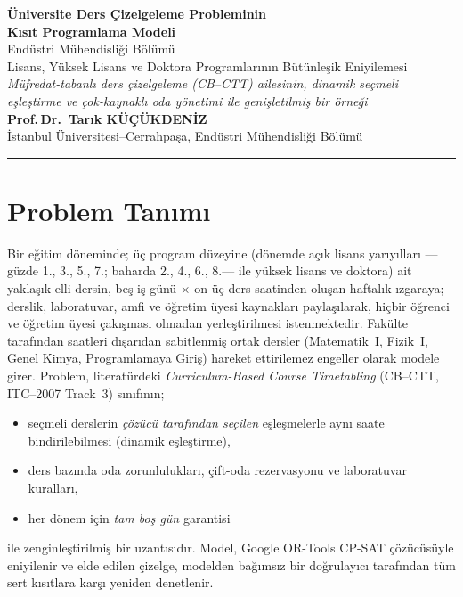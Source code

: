 \documentclass[11pt,a4paper]{article}
\theoremstyle{definition}
\begin{document}
\begin{center}
  {\color{iucnavy}\LARGE\bfseries Üniversite Ders Çizelgeleme Probleminin\\[2pt]
  Kısıt Programlama Modeli}\\[8pt]
  {\large Endüstri Mühendisliği Bölümü\\
  Lisans, Yüksek Lisans ve Doktora Programlarının Bütünleşik Eniyilemesi}\\[6pt]
  {\small\itshape Müfredat-tabanlı ders çizelgeleme (CB--CTT) ailesinin,
  dinamik seçmeli eşleştirme ve çok-kaynaklı oda yönetimi ile genişletilmiş bir örneği}\\[10pt]
  {\normalsize\bfseries Prof.\,Dr.\ Tarık KÜÇÜKDENİZ}\\[2pt]
  {\small İstanbul Üniversitesi--Cerrahpaşa, Endüstri Mühendisliği Bölümü}\\[6pt]
  \rule{0.6\textwidth}{0.6pt}
\end{center}

\section{Problem Tanımı}

Bir eğitim döneminde; üç program düzeyine (dönemde açık lisans yarıyılları ---
güzde 1., 3., 5., 7.; baharda 2., 4., 6., 8.--- ile yüksek lisans ve doktora) ait yaklaşık elli dersin, beş iş günü $\times$ on üç ders
saatinden oluşan haftalık ızgaraya; derslik, laboratuvar, amfi ve öğretim üyesi
kaynakları paylaşılarak, hiçbir öğrenci ve öğretim üyesi çakışması olmadan
yerleştirilmesi istenmektedir. Fakülte tarafından saatleri dışarıdan sabitlenmiş
ortak dersler (Matematik~I, Fizik~I, Genel Kimya, Programlamaya Giriş) hareket
ettirilemez engeller olarak modele girer. Problem, literatürdeki
\emph{Curriculum-Based Course Timetabling} (CB--CTT, ITC--2007 Track~3) sınıfının;
\begin{itemize}[nosep]
  \item seçmeli derslerin \emph{çözücü tarafından seçilen} eşleşmelerle aynı saate
        bindirilebilmesi (dinamik eşleştirme),
  \item ders bazında oda zorunlulukları, çift-oda rezervasyonu ve laboratuvar
        kuralları,
  \item her dönem için \emph{tam boş gün} garantisi
\end{itemize}
ile zenginleştirilmiş bir uzantısıdır. Model, Google OR-Tools \textsc{CP-SAT}
çözücüsüyle eniyilenir ve elde edilen çizelge, modelden bağımsız bir doğrulayıcı
tarafından tüm sert kısıtlara karşı yeniden denetlenir.
\end{document}
